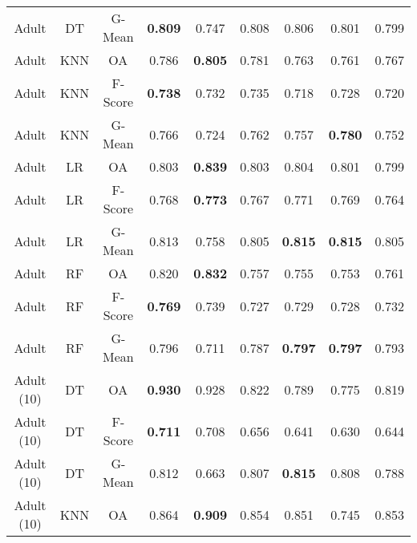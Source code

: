 \begin{longtable}{ccccccccc}
             Adult &         DT &  G-Mean & \textbf{0.809} &          0.747 &          0.808 &          0.806 &          0.801 &          0.799 \\
             Adult &        KNN &      OA &          0.786 & \textbf{0.805} &          0.781 &          0.763 &          0.761 &          0.767 \\
             Adult &        KNN & F-Score & \textbf{0.738} &          0.732 &          0.735 &          0.718 &          0.728 &          0.720 \\
             Adult &        KNN &  G-Mean &          0.766 &          0.724 &          0.762 &          0.757 & \textbf{0.780} &          0.752 \\
             Adult &         LR &      OA &          0.803 & \textbf{0.839} &          0.803 &          0.804 &          0.801 &          0.799 \\
             Adult &         LR & F-Score &          0.768 & \textbf{0.773} &          0.767 &          0.771 &          0.769 &          0.764 \\
             Adult &         LR &  G-Mean &          0.813 &          0.758 &          0.805 & \textbf{0.815} & \textbf{0.815} &          0.805 \\
             Adult &         RF &      OA &          0.820 & \textbf{0.832} &          0.757 &          0.755 &          0.753 &          0.761 \\
             Adult &         RF & F-Score & \textbf{0.769} &          0.739 &          0.727 &          0.729 &          0.728 &          0.732 \\
             Adult &         RF &  G-Mean &          0.796 &          0.711 &          0.787 & \textbf{0.797} & \textbf{0.797} &          0.793 \\
        Adult (10) &         DT &      OA & \textbf{0.930} &          0.928 &          0.822 &          0.789 &          0.775 &          0.819 \\
        Adult (10) &         DT & F-Score & \textbf{0.711} &          0.708 &          0.656 &          0.641 &          0.630 &          0.644 \\
        Adult (10) &         DT &  G-Mean &          0.812 &          0.663 &          0.807 & \textbf{0.815} &          0.808 &          0.788 \\
        Adult (10) &        KNN &      OA &          0.864 & \textbf{0.909} &          0.854 &          0.851 &          0.745 &          0.853 \\

\end{longtable}
